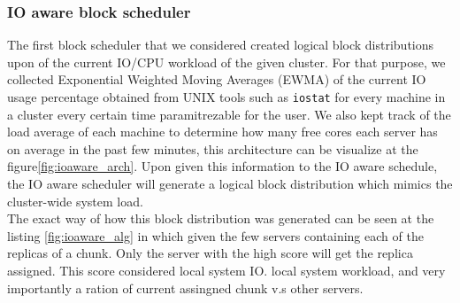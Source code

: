 \subsubsection{IO aware block scheduler}
The first block scheduler that we considered created logical block distributions upon of the current IO/CPU workload of the given cluster. For that purpose, we collected Exponential Weighted Moving Averages (EWMA) of the current IO usage percentage obtained from UNIX tools such as \texttt{iostat} for every machine in a cluster every certain time paramitrezable for the user. We also kept track of the load average of each machine to determine how many free cores each server has on average in the past few minutes, this architecture can be visualize at the figure\ref{fig:ioaware_arch}.  Upon given this information to the IO aware schedule, the IO aware scheduler will generate a logical block distribution which mimics the cluster-wide system load. \\ 
The exact way of how this block distribution was generated can be seen at the listing \ref{fig:ioaware_alg} in which given the few servers containing each of the replicas of a chunk. Only the server with the high score will get the replica assigned. This score considered local system IO. local system workload, and very importantly a ration of current assingned chunk v.s other servers.

